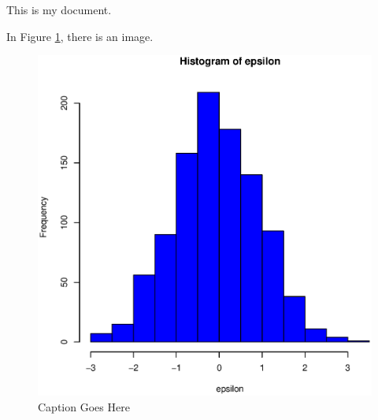 \documentclass[11pt]{paper}
\begin{document}
This is my document.

In Figure \ref{fig:example}, there is an image.



\begin{figure}
\centering
\includegraphics[width=\textwidth]{Figures/name_of_figure.eps}
\caption{Caption Goes Here}
\label{fig:example}
\end{figure}
\end{document}
